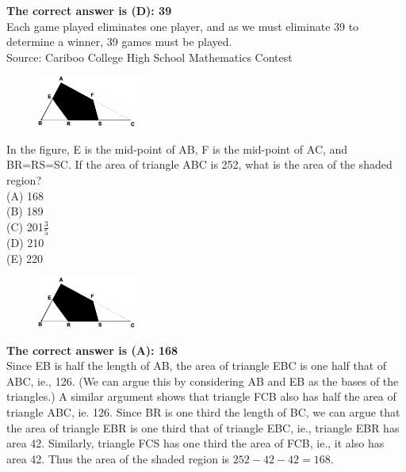 \documentclass{article}
\begin{document}

\textbf{The correct answer is (D): 39}\\[1 ex]
Each game played eliminates one player, and as we must eliminate 39 to determine a winner, 39 games must be played.
\\[5 ex]

\scriptsize
Source: Cariboo College High School Mathematics Contest

\normalsize
\begin{figure}
	\includegraphics[width=35mm,viewport=4 102 497 362]{CCSPR73-10pic.eps}
\end{figure}
In the figure, E is the mid-point of AB, F is the mid-point of AC, and BR=RS=SC. If the area of triangle ABC is 252, what is the area of the shaded region?\\
(A) 168\\
(B) 189\\
(C) 201$\frac{3}{5}$\\
(D) 210\\
(E) 220\\

\begin{figure}
	\includegraphics[width=35mm,viewport=4 102 497 362]{CCSPR73-10pic.eps}
\end{figure}

\textbf{The correct answer is (A): 168}\\[1 ex]
Since EB is half the length of AB, the area of triangle EBC is one half that of ABC, ie., 126.  (We can argue this by considering AB and EB as the bases of the triangles.) A similar argument shows that triangle FCB also has half the area of triangle ABC, ie. 126. Since BR is one third the length of BC, we can argue that the area of triangle EBR is one third that of triangle EBC, ie., triangle EBR has area 42. Similarly, triangle FCS has one third the area of FCB, ie., it also has area 42. Thus the area of the shaded region is $252-42-42=168$.
\\[5 ex]
\end{document}
